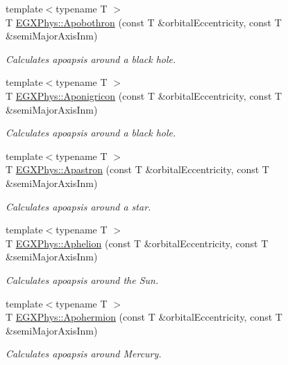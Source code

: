 \begin{DoxyCompactItemize}
{\footnotesize template$<$typename T $>$ }\\T \mbox{\hyperlink{group___e_g_x_phys-_apoapsis_ga95add3a7ff4e799bff0a508c9bdaa408}{E\+G\+X\+Phys\+::\+Apobothron}} (const T \&orbital\+Eccentricity, const T \&semi\+Major\+Axis\+Inm)
\begin{DoxyCompactList}\small\item\em Calculates apoapsis around a black hole. \end{DoxyCompactList}\item 
{\footnotesize template$<$typename T $>$ }\\T \mbox{\hyperlink{group___e_g_x_phys-_apoapsis_gabceed387c4cdd53b8ccebafe2e8da8e1}{E\+G\+X\+Phys\+::\+Aponigricon}} (const T \&orbital\+Eccentricity, const T \&semi\+Major\+Axis\+Inm)
\begin{DoxyCompactList}\small\item\em Calculates apoapsis around a black hole. \end{DoxyCompactList}\item 
{\footnotesize template$<$typename T $>$ }\\T \mbox{\hyperlink{group___e_g_x_phys-_apoapsis_ga809627c2522d7b4db0f27d6ea89e4f89}{E\+G\+X\+Phys\+::\+Apastron}} (const T \&orbital\+Eccentricity, const T \&semi\+Major\+Axis\+Inm)
\begin{DoxyCompactList}\small\item\em Calculates apoapsis around a star. \end{DoxyCompactList}\item 
{\footnotesize template$<$typename T $>$ }\\T \mbox{\hyperlink{group___e_g_x_phys-_apoapsis_ga31b1bd55ee4ebe33f2af6827bfe30515}{E\+G\+X\+Phys\+::\+Aphelion}} (const T \&orbital\+Eccentricity, const T \&semi\+Major\+Axis\+Inm)
\begin{DoxyCompactList}\small\item\em Calculates apoapsis around the Sun. \end{DoxyCompactList}\item 
{\footnotesize template$<$typename T $>$ }\\T \mbox{\hyperlink{group___e_g_x_phys-_apoapsis_ga50a476b4a3c9be6ded8308a247bf001c}{E\+G\+X\+Phys\+::\+Apohermion}} (const T \&orbital\+Eccentricity, const T \&semi\+Major\+Axis\+Inm)
\begin{DoxyCompactList}\small\item\em Calculates apoapsis around Mercury. \end{DoxyCompactList}\item 

\end{DoxyCompactItemize}
